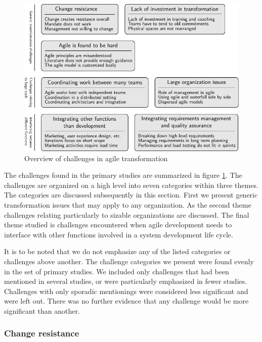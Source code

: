 \documentclass[preprint,authoryear,12pt]{elsarticle}
\begin{document}
\begin{figure}[!b]
  \begin{center}
    \includegraphics{graphics/challenges_summary.pdf}
    \caption{Overview of challenges in agile transformation}
    \label{fig:challenges_summary}
  \end{center}
\end{figure}

The challenges found in the primary studies are summarized in figure
\ref{fig:challenges_summary}. The challenges are organized on a high level into
seven categories within three themes. The categories are discussed subsequently
in this section. First we present generic transformation issues that may apply
to any organization. As the second theme challenges relating particularly to
sizable organizations are discussed. The final theme studied is challenges
encountered when agile development needs to interface with other functions
involved in a system development life cycle.

It is to be noted that we do not emphasize any of the listed categories or
challenges above another. The challenge categories we present were found evenly
in the set of primary studies. We included only challenges that had been
mentioned in several studies, or were particularly emphasized in fewer studies.
Challenges with only sporadic mentionings were considered less significant and
were left out. There was no further evidence that any challenge would be more
significant than another.


\subsubsection{Change resistance}
\end{document}
